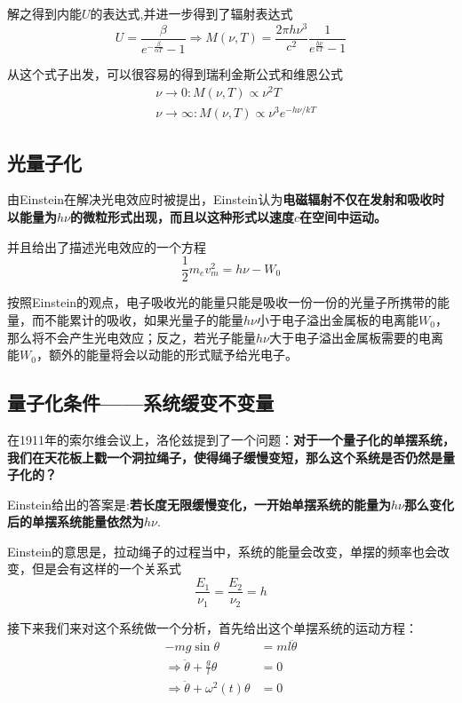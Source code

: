 \documentclass{article}
\begin{document}
解之得到内能$U$的表达式,并进一步得到了辐射表达式
\begin{equation*}
    U =\frac{\beta}{e^{-\frac{\beta}{\alpha T}}-1}\Rightarrow M(\nu,T)=\frac{2\pi h\nu^3}{c^2}\frac{1}{e^{\frac{h\nu}{kT}}-1}
\end{equation*}

从这个式子出发，可以很容易的得到瑞利金斯公式和维恩公式
\begin{align*}
     & \nu\to0:      M(\nu,T)\propto\nu^2T            \\
     & \nu\to\infty: M(\nu,T)\propto\nu^3e^{-h\nu/kT}
\end{align*}







\subsection{光量子化}
由Einstein在解决光电效应时被提出，Einstein认为\textbf{电磁辐射不仅在发射和吸收时以能量为}$h\nu$\textbf{的微粒形式出现，而且以这种形式以速度}$c$\textbf{在空间中运动。}

并且给出了描述光电效应的一个方程
\[\frac{1}{2}m_ev_m^2=h\nu-W_0\]

按照Einstein的观点，电子吸收光的能量只能是吸收一份一份的光量子所携带的能量，而不能累计的吸收，如果光量子的能量$h\nu$小于电子溢出金属板的电离能$W_0$，那么将不会产生光电效应；反之，若光子能量$h\nu$大于电子溢出金属板需要的电离能$W_0$，额外的能量将会以动能的形式赋予给光电子。



\subsection{量子化条件——系统缓变不变量}
在1911年的索尔维会议上，洛伦兹提到了一个问题：\textbf{对于一个量子化的单摆系统，我们在天花板上戳一个洞拉绳子，使得绳子缓慢变短，那么这个系统是否仍然是量子化的？}

Einstein给出的答案是:\textbf{若长度无限缓慢变化，一开始单摆系统的能量为}$h\nu$\textbf{那么变化后的单摆系统能量依然为}$h\nu$.

Einstein的意思是，拉动绳子的过程当中，系统的能量会改变，单摆的频率也会改变，但是会有这样的一个关系式
\[\frac{E_1}{\nu_1}=\frac{E_2}{\nu_2}=h\]

接下来我们来对这个系统做一个分析，首先给出这个单摆系统的运动方程：
\begin{align*}
    -mg\sin\theta                              & =ml\ddot{\theta} \\
    \Rightarrow\ddot{\theta}+\frac{g}{l}\theta & = 0              \\
    \Rightarrow\ddot{\theta}+\omega^2(t)\theta & = 0
\end{align*}
\end{document}
